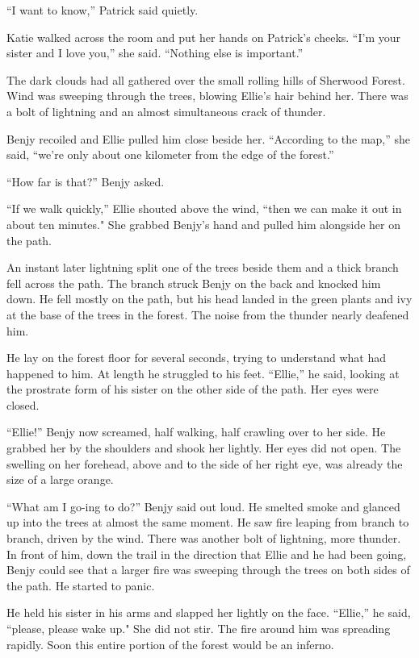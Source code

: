 \documentclass[]{article}
\begin{document}
{“I want to know,” Patrick said quietly.

Katie walked across the room and put her hands on Patrick’s cheeks.  “I’m your sister and I love you,” she said.  “Nothing else is important.”

The dark clouds had all gathered over the small rolling hills of Sherwood Forest.  Wind was sweeping through the trees, blowing Ellie’s hair behind her.  There was a bolt of lightning and an almost simultaneous crack of thunder.

Benjy recoiled and Ellie pulled him close beside her.  “According to the map,” she said, “we’re only about one kilometer from the edge of the forest.”

“How far is that?” Benjy asked.

“If we walk quickly,” Ellie shouted above the wind, “then we can make it out in about ten minutes."  She grabbed Benjy’s hand and pulled him alongside her on the path.

An instant later lightning split one of the trees beside them and a thick branch fell across the path.  The branch struck Benjy on the back and knocked him down.  He fell mostly on the path, but his head landed in the green plants and ivy at the base of the trees in the forest.  The noise from the thunder nearly deafened him.

He lay on the forest floor for several seconds, trying to understand what had happened to him.  At length he struggled to his feet.  “Ellie,” he said, looking at the prostrate form of his sister on the other side of the path.  Her eyes were closed.

“Ellie!” Benjy now screamed, half walking, half crawling over to her side.  He grabbed her by the shoulders and shook her lightly.  Her eyes did not open.  The swelling on her forehead, above and to the side of her right eye, was already the size of a large orange.

“What am I go-ing to do?” Benjy said out loud.  He smelted smoke and glanced up into the trees at almost the same moment.  He saw fire leaping from branch to branch, driven by the wind.  There was another bolt of lightning, more thunder.  In front of him, down the trail in the direction that Ellie and he had been going, Benjy could see that a larger fire was sweeping through the trees on both sides of the path.  He started to panic.

He held his sister in his arms and slapped her lightly on the face.  “Ellie,” he said, “please, please wake up."  She did not stir.  The fire around him was spreading rapidly.  Soon this entire portion of the forest would be an inferno.

}
\end{document}
